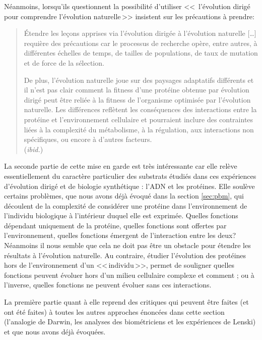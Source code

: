 Néanmoins, lorsqu'ils questionnent la possibilité d'utiliser <<\, l'évolution dirigé pour comprendre l'évolution naturelle\,>> \citet[p.~874]{romero09exploringproteinfitnesslandscapesbydirectedevolution} insistent sur les précautions à prendre:
\begin{quotation}
	Étendre les leçons apprises via l'évolution dirigée à l'évolution naturelle [\ldots] requière des précautions car le processus de recherche opère, entre autres, à différentes échelles de temps, de tailles de populations, de taux de mutation et de force de la sélection. 

	De plus, l'évolution naturelle joue sur des paysages adaptatifs différents et il n'est pas clair comment la fitness d'une protéine obtenue par évolution dirigé peut être reliée à la fitness de l'organisme optimisée par l'évolution naturelle. Les différences reflètent les conséquences des interactions entre la protéine et l'environnement cellulaire et pourraient inclure des contraintes liées à la complexité du métabolisme, à la régulation, aux interactions non spécifiques, ou encore à d'autres facteurs.
	\\(\emph{ibid.})
\end{quotation}

La seconde partie de cette mise en garde est très intéressante car elle relève essentiellement du caractère particulier des substrats étudiés dans ces expériences d'évolution dirigé et de biologie synthétique : l'ADN et les protéines. Elle soulève certains problèmes, que nous avons déjà évoqué dans la section \ref{sec:pbm}, qui découlent de la complexité de considérer une protéine dans l'environnement de l'individu biologique à l'intérieur duquel elle est exprimée. Quelles fonctions dépendant uniquement de la protéine, quelles fonctions sont offertes par l'environnement, quelles fonctions émergent de l'interaction entre les deux? Néanmoins il nous semble que cela ne doit pas être un obstacle pour étendre les résultats à l'évolution naturelle. Au contraire, étudier l'évolution des protéines hors de l'environnement d'un <<\,individu\,>>, permet de souligner quelles fonctions peuvent évoluer hors d'un milieu cellulaire complexe et comment ; ou à l'inverse, quelles fonctions ne peuvent évoluer sans ces interactions.

La première partie quant à elle reprend des critiques qui peuvent être faites (et ont été faites) à toutes les autres approches énoncées dans cette section (l'analogie de Darwin, les analyses des biométriciens et les expériences de Lenski) et que nous avons déjà évoquées.

